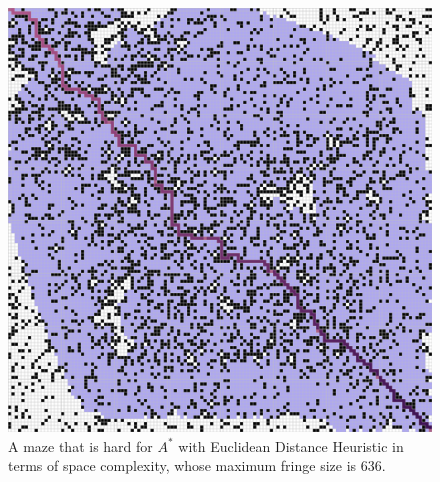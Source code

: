 \documentclass[letter]{article}
\begin{document}
\begin{enumerate}[resume]
\begin{enumerate}
\begin{enumerate}
\begin{figure}
					\includegraphics[width=\textwidth]{../pics/aef/636.png}
					\caption{\label{fig:aef1}A maze that is hard for $ A^* $ with Euclidean Distance Heuristic in terms of space complexity, whose maximum fringe size is 636. }
					

\end{figure}
\end{enumerate}
\end{enumerate}
\end{enumerate}
\end{document}
